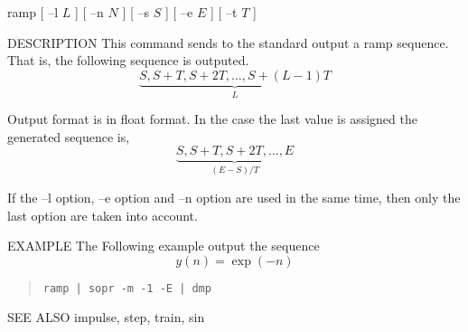 
\begin{synopsis}
\item[ramp] [ --l $L$ ] [ --n $N$ ] [ --s $S$ ] [ --e $E$ ] [ --t $T$ ]
\end{synopsis}

\begin{qsection}{DESCRIPTION}
This command sends to the standard output a ramp sequence.
That is, the following sequence is outputed.
\begin{displaymath}
\underbrace{S, S+T, S+2T,  \ldots, S+(L-1)T}_{L}
\end{displaymath}
\par
Output format is in float format.
In the case the last value is assigned 
the generated sequence is,
\begin{displaymath}
\underbrace{S, S+T, S+2T,  \ldots, E}_{(E-S)/T}
\end{displaymath}
\par
If the --l option, --e option and --n option are used
in the same time, then only the last option are taken into account.
\end{qsection}

\begin{options}
\end{options}

\begin{qsection}{EXAMPLE}
The Following example output the sequence 
\begin{displaymath}
  y(n)=\exp(-n)
\end{displaymath}
\begin{quote}
\verb!ramp | sopr -m -1 -E | dmp!
\end{quote}
\end{qsection}

\begin{qsection}{SEE ALSO}
  impulse, step, train, sin
\end{qsection}
